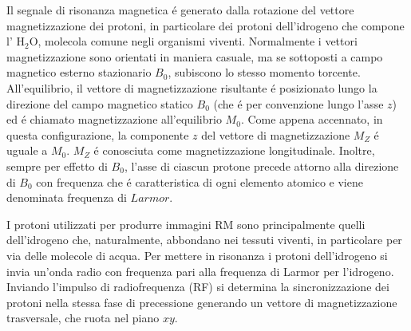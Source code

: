 \documentclass[a4paper,12pt]{report}
\begin{document}
 Il segnale di risonanza magnetica \'e generato dalla rotazione del vettore magnetizzazione dei protoni, in particolare dei protoni dell'idrogeno che compone l' $\mbox{H}_2\mbox{O}$, molecola comune negli organismi viventi. 
 Normalmente i vettori magnetizzazione sono orientati in maniera casuale, ma se sottoposti a campo magnetico esterno stazionario $B_0$, subiscono lo stesso momento torcente.
 All'equilibrio, il vettore di magnetizzazione risultante \'e posizionato lungo la direzione del campo magnetico statico $B_0$ (che \'e per convenzione lungo l'asse $z$) ed \'e chiamato magnetizzazione all'equilibrio $M_0$. 
 Come appena accennato, in questa configurazione, la componente $z$ del vettore di magnetizzazione $M_Z$ \'e uguale a $M_0$. 
 $M_Z$ \'e conosciuta come magnetizzazione longitudinale. 
 Inoltre, sempre per effetto di $B_0$, l'asse di ciascun protone precede attorno alla direzione di $B_0$ con frequenza che \'e caratteristica di ogni elemento atomico e viene denominata frequenza di $Larmor$.
 
 I protoni utilizzati per produrre immagini RM sono principalmente quelli dell'idrogeno che, naturalmente, abbondano nei tessuti viventi, in particolare per via delle molecole di acqua.
 Per mettere in risonanza i protoni dell'idrogeno si invia un'onda radio con frequenza pari alla frequenza di Larmor per l'idrogeno.
 Inviando l'impulso di radiofrequenza (RF) si determina la sincronizzazione dei protoni nella stessa fase di precessione generando un vettore di magnetizzazione trasversale, che ruota nel piano $xy$.
 
\end{document}
